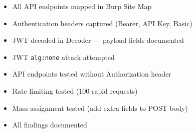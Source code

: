 \begin{tcolorbox}[findingstyle, title={Level 05 Burp Checklist}]
\begin{itemize}
  \item[\checkbox] All API endpoints mapped in Burp Site Map
  \item[\checkbox] Authentication headers captured (Bearer, API Key, Basic)
  \item[\checkbox] JWT decoded in Decoder — payload fields documented
  \item[\checkbox] JWT \texttt{alg:none} attack attempted
  \item[\checkbox] API endpoints tested without Authorization header
  \item[\checkbox] Rate limiting tested (100 rapid requests)
  \item[\checkbox] Mass assignment tested (add extra fields to POST body)
  \item[\checkbox] All findings documented
\end{itemize}
\end{tcolorbox}
